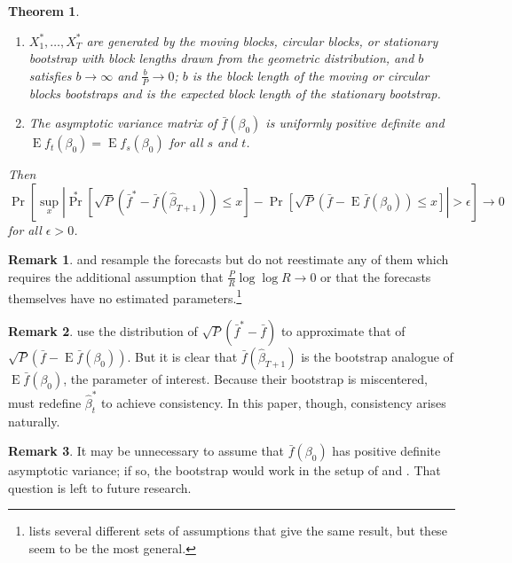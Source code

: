 \documentclass[11pt,fleqn]{article}
\newtheorem{thm}{Theorem}
\theoremstyle{definition}
\newtheorem{rem}{Remark}
\DeclareMathOperator{\E}{E}
\DeclareMathOperator{\pr}{Pr}
\begin{document}
\begin{thm}
\begin{enumerate}
  \item $X_1^{*},\dots,X_T^{*}$ are generated by the moving blocks,
    circular blocks, or stationary bootstrap with block lengths drawn
    from the geometric distribution, and $b$ satisfies $b \to \infty$
    and $\frac{b}{P} \to 0$; $b$ is the block length of the moving or
    circular blocks bootstraps and is the expected block length of the
    stationary bootstrap.
  \item The asymptotic variance matrix of $\bar{f}(\beta_0)$ is
    uniformly positive definite and $\E f_t(\beta_0) = \E
    f_s(\beta_0)$ for all $s$ and $t$.
  \end{enumerate}
  Then
  \begin{equation}
    \pr[\sup_x | \pr^*[\sqrt{P} (\bar{f}^* - \bar{f}(\hat{\beta}_{T+1}))
        \leq x] - \pr[\sqrt{P}( \bar{f} - \E \bar{f}(\beta_0)) \leq x] | >
      \epsilon] \to 0
  \end{equation}
  for all $\epsilon > 0$.
\end{thm}

\begin{rem}
  \citet{Whi:00} and \citet{Han:05} resample the forecasts but do not
  reestimate any of them which requires the additional assumption that
  $\tfrac{P}{R} \log \log R \to 0$ or that the forecasts themselves
  have no estimated parameters.\footnote{\citet{Whi:00} lists several
    different sets of assumptions that give the same result, but these
    seem to be the most general.}
\end{rem}

\begin{rem}
  \citet{CoS:07} use the distribution of $\sqrt{P}(\bar{f}^{*} -
  \bar{f})$ to approximate that of $\sqrt{P}(\bar{f} - \E
  \bar{f}(\beta_0))$.  But it is clear that
  $\bar{f}(\hat{\beta}_{T+1})$ is the bootstrap analogue of $\E
  \bar{f}(\beta_0)$, the parameter of interest.  Because their
  bootstrap is miscentered, \citet{CoS:07} must redefine
  $\hat{\beta}_t^{*}$ to achieve consistency.  In this paper, though,
  consistency arises naturally.
\end{rem}

\begin{rem}
  It may be unnecessary to assume that $\bar{f}(\beta_0)$ has positive
  definite asymptotic variance; if so, the bootstrap would work in the
  setup of \citet{ClM:05,ClM:01} and \citet{Mcc:07}.  That question is
  left to future research.
\end{rem}
\end{document}
